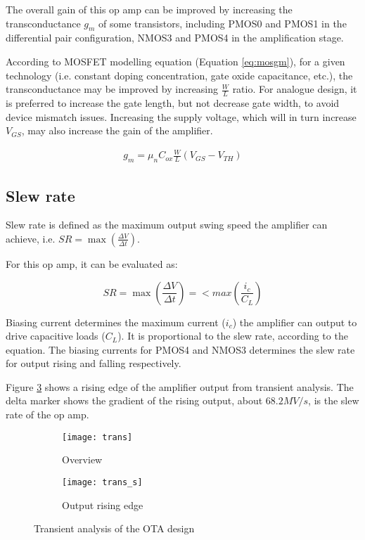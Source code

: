 The overall gain of this op amp can be improved by increasing the transconductance $g_m$ of some transistors, including PMOS0 and PMOS1 in the differential pair configuration, NMOS3 and PMOS4 in the amplification stage.

According to MOSFET modelling equation (Equation \ref{eq:mosgm}), for a given technology (i.e. constant doping concentration, gate oxide capacitance, etc.), the transconductance may be improved by increasing $\frac{W}{L}$ ratio. For analogue design, it is preferred to increase the gate length, but not decrease gate width, to avoid device mismatch issues. Increasing the supply voltage, which will in turn increase $V_{GS}$, may also increase the gain of the amplifier.

\begin{align}
	g_m = \mu_n C_{ox} \frac{W}{L} (V_{GS} - V_{TH})
	\label{eq:mosgm}
\end{align}

\subsection{Slew rate}

Slew rate is defined as the maximum output swing speed the amplifier can achieve, i.e. $SR = \max(\frac{\Delta V}{\Delta t})$.

For this op amp, it can be evaluated as:

$$ SR = \max(\frac{\Delta V}{\Delta t}) = <max(\frac{i_c}{C_L}) $$

Biasing current determines the maximum current ($i_c$) the amplifier can output to drive capacitive loads ($C_L$). It is proportional to the slew rate, according to the equation. The biasing currents for PMOS4 and NMOS3 determines the slew rate for output rising and falling respectively.

Figure \ref{fig:trans_s} shows a rising edge of the amplifier output from transient analysis. The delta marker shows the gradient of the rising output, about $68.2 MV/s$, is the slew rate of the op amp.

\begin{figure}[!htb]
	\centering
	\begin{subfigure}[b]{0.45\textwidth}
		\texttt{[image: trans]}
		\caption{Overview}
		\label{fig:trans_o}
	\end{subfigure}
	\begin{subfigure}[b]{0.45\textwidth}
		\texttt{[image: trans\_s]}
		\caption{Output rising edge}
		\label{fig:trans_s}
	\end{subfigure}
	\caption{Transient analysis of the OTA design}
\end{figure}
